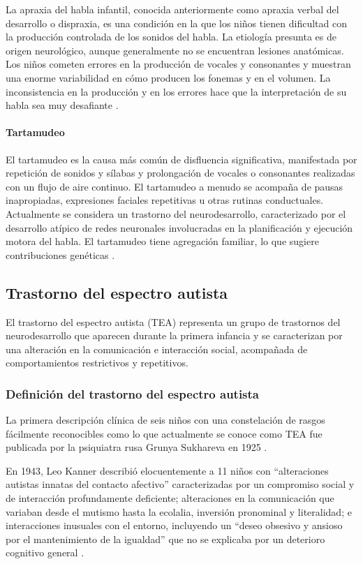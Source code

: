 La apraxia del habla infantil, conocida anteriormente como apraxia verbal del
desarrollo o dispraxia, es una condición en la que los niños tienen dificultad
con la producción controlada de los sonidos del habla. La etiología presunta es
de origen neurológico, aunque generalmente no se encuentran lesiones anatómicas.
Los niños cometen errores en la producción de vocales y consonantes y muestran
una enorme variabilidad en cómo producen los fonemas y en el volumen. La
inconsistencia en la producción y en los errores hace que la interpretación de
su habla sea muy desafiante \cite{Feldman44}.

\paragraph{Tartamudeo}
El tartamudeo es la causa más común de disfluencia significativa, manifestada
por repetición de sonidos y sílabas y prolongación de vocales o consonantes
realizadas con un flujo de aire continuo. El tartamudeo a menudo se acompaña
de pausas inapropiadas, expresiones faciales repetitivas u otras rutinas
conductuales. Actualmente se considera un trastorno del neurodesarrollo,
caracterizado por el desarrollo atípico de redes neuronales involucradas en la
planificación y ejecución motora del habla. El tartamudeo tiene agregación
familiar, lo que sugiere contribuciones genéticas \cite{Feldman44}.

\subsection{Trastorno del espectro autista}
El trastorno del espectro autista (TEA) representa un grupo de trastornos del
neurodesarrollo que aparecen durante la primera infancia y se caracterizan por
una alteración en la comunicación e interacción social, acompañada de
comportamientos restrictivos y repetitivos.

\subsubsection{Definición del trastorno del espectro autista}
La primera descripción clínica de seis niños con una constelación de rasgos
fácilmente reconocibles como lo que actualmente se conoce como TEA fue
publicada por la psiquiatra rusa Grunya Sukhareva en 1925 \cite{Myers2025}.

En 1943, Leo Kanner describió elocuentemente a 11 niños con ``alteraciones
autistas innatas del contacto afectivo'' caracterizadas por un compromiso
social y de interacción profundamente deficiente; alteraciones en la
comunicación que variaban desde el mutismo hasta la ecolalia, inversión
pronominal y literalidad; e interacciones inusuales con el entorno, incluyendo
un ``deseo obsesivo y ansioso por el mantenimiento de la igualdad'' que no se
explicaba por un deterioro cognitivo general \cite{Myers2025}.

